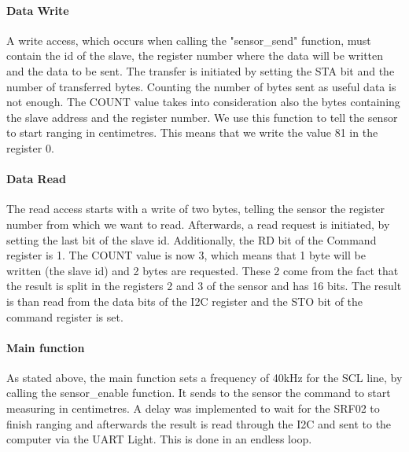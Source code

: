 			\paragraph{Data Write} %
	   		\label{par:data_write_task1}
	   			A write access, which occurs when calling the "sensor\_send" function, must contain the id of the slave, the register number where the data will be written and the data to be sent. The transfer is initiated by setting the STA bit and the number of transferred bytes. Counting the number of bytes sent as useful data is not enough. The COUNT value takes into consideration also the bytes containing the slave address and the register number.
				We use this function to tell the sensor to start ranging in centimetres. This means that we write the value 81 in the register 0.
			
			\paragraph{Data Read} %
	   		\label{par:data_read_task1}
	   			The read access starts with a write of two bytes, telling the sensor the register number from which we want to read. Afterwards, a read request is initiated, by setting the last bit of the slave id. Additionally, the RD bit of the Command register is 1. The COUNT value is now 3, which means that 1 byte will be written (the slave id) and 2 bytes are requested. These 2 come from the fact that the result is split in the registers 2 and 3 of the sensor and has 16 bits. The result is than read from the data bits of the I2C register and the STO bit of the command register is set.
			
			\paragraph{Main function} %
	   		\label{par:data_read_task1}
	   			As stated above, the main function sets a frequency of 40kHz for the SCL line, by calling the sensor\_enable function. It sends to the sensor the command to start measuring in centimetres. A delay was implemented to wait for the SRF02 to finish ranging and afterwards the result is read through the I2C and sent to the computer via the UART Light. This is done in an endless loop.

